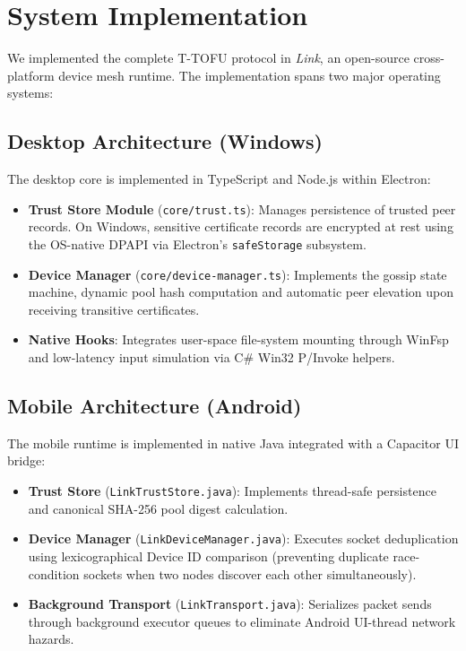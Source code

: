 \documentclass[conference,a4paper]{IEEEtran}
\begin{document}
\section{System Implementation}

We implemented the complete T-TOFU protocol in \textit{Link}, an open-source cross-platform device mesh runtime. The implementation spans two major operating systems:

\subsection{Desktop Architecture (Windows)}
The desktop core is implemented in TypeScript and Node.js within Electron:
\begin{itemize}
    \item \textbf{Trust Store Module} (\texttt{core/trust.ts}): Manages persistence of trusted peer records. On Windows, sensitive certificate records are encrypted at rest using the OS-native DPAPI via Electron's \texttt{safeStorage} subsystem.
    \item \textbf{Device Manager} (\texttt{core/device-manager.ts}): Implements the gossip state machine, dynamic pool hash computation and automatic peer elevation upon receiving transitive certificates.
    \item \textbf{Native Hooks}: Integrates user-space file-system mounting through WinFsp \cite{winfsp} and low-latency input simulation via C\# Win32 P/Invoke helpers.
\end{itemize}

\subsection{Mobile Architecture (Android)}
The mobile runtime is implemented in native Java integrated with a Capacitor UI bridge:
\begin{itemize}
    \item \textbf{Trust Store} (\texttt{LinkTrustStore.java}): Implements thread-safe persistence and canonical SHA-256 pool digest calculation.
    \item \textbf{Device Manager} (\texttt{LinkDeviceManager.java}): Executes socket deduplication using lexicographical Device ID comparison (preventing duplicate race-condition sockets when two nodes discover each other simultaneously).
    \item \textbf{Background Transport} (\texttt{LinkTransport.java}): Serializes packet sends through background executor queues to eliminate Android UI-thread network hazards.
\end{itemize}
\end{document}

